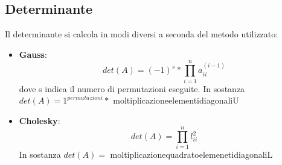 \subsection{Determinante}
\label{Determinante}
Il determinante si calcola in modi diversi a seconda del metodo utilizzato:
\begin{itemize}
\item \textbf{Gauss}: $$det(A) = (-1)^s * \prod_{i=1}^{n} a^{(i-1)}_{ii}$$ dove s indica il numero di permutazioni eseguite. In sostanza \\$det(A) = 1^{permutazioni} *$ moltiplicazione\textunderscore elementi\textunderscore diagonali\textunderscore U
\item \textbf{Cholesky}: $$det(A) = \prod_{i=1}^{n} l^2_{ii}$$ In sostanza $det(A) =$ moltiplicazione\textunderscore quadrato\textunderscore elemeneti\textunderscore diagonali\textunderscore L
\end{itemize}

